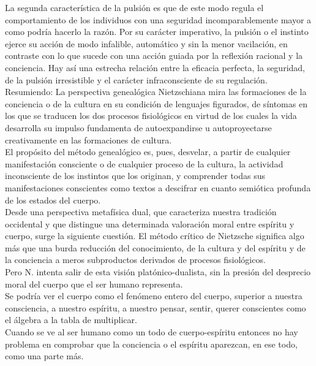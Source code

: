 \documentclass[a4paper, 10pt, twocolumn, spanish]{article}
\begin{document}
La segunda característica de la pulsión es que de este modo regula el
comportamiento de los individuos con una seguridad incomparablemente
mayor a como podría hacerlo la razón. Por su carácter imperativo, la
pulsión o el instinto ejerce su acción de modo infalible, automático y
sin la menor vacilación, en contraste con lo que sucede con una acción
guiada por la reflexión racional y la conciencia. Hay así una estrecha
relación entre la eficacia perfecta, la seguridad, de la pulsión
irresistible y el carácter infraconsciente de su regulación.\\[0pt]

Resumiendo: La perspectiva genealógica Nietzschiana mira las
formaciones de la conciencia o de la cultura en su condición de
lenguajes figurados, de síntomas en los que se traducen los dos
procesos fisiológicos en virtud de los cuales la vida desarrolla su
impulso fundamenta de autoexpandirse u autoproyectarse creativamente
en las formaciones de cultura.\\[0pt]
El propósito del método genealógico es, pues, desvelar, a partir de
cualquier manifestación consciente o de cualquier proceso de la
cultura, la actividad inconsciente de los instintos que los originan, y
comprender todas sus manifestaciones conscientes como textos a
descifrar en cuanto semiótica profunda de los estados del cuerpo.\\[0pt]

Desde una perspectiva metafísica dual, que caracteriza nuestra
tradición occidental y que distingue una determinada valoración moral
entre espíritu y cuerpo, surge la siguiente cuestión. El método
crítico de Nietzsche significa algo más que una burda reducción del
conocimiento, de la cultura y del espíritu y de la conciencia a meros
subproductos derivados de procesos fisiológicos.\\[0pt]

Pero N. intenta salir de esta visión platónico-dualista, sin la
presión del desprecio moral del cuerpo que el ser humano representa.\\[0pt]
Se podría ver el cuerpo como el fenómeno entero del cuerpo, superior a
nuestra consciencia, a nuestro espíritu, a nuestro pensar, sentir,
querer conscientes como el álgebra a la tabla de multiplicar.\\[0pt]
Cuando se ve al ser humano como un todo de cuerpo-espíritu entonces no
hay problema en comprobar que la conciencia o el espíritu aparezcan,
en ese todo, como una parte más.\\[0pt]
\end{document}
